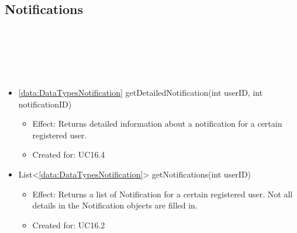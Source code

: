   \subsection{Notifications}\label{int:OnlineServiceOnlineServiceNotificationHandlerNotifications}
    \begin{description}
      \item[Provided by:] \iconcomponent{}~
      \item[Required by:] \iconcomponent{}~
      \item[Operations:] ~
    \begin{itemize}[noitemsep,nolistsep,leftmargin=-.25cm]
      \item \textsf{\ref{data:DataTypesNotification} getDetailedNotification(int userID, int notificationID)}
        \begin{itemize}[noitemsep,nolistsep]
           \item Effect: Returns detailed information about a notification for a certain registered user.
\item Created for: UC16.4
        \end{itemize}
      \item \textsf{List\textless{}\ref{data:DataTypesNotification}\textgreater{} getNotifications(int userID)}
        \begin{itemize}[noitemsep,nolistsep]
           \item Effect: Returns a list of Notification for a certain registered user. Not all details in the Notification objects are filled in.
\item Created for: UC16.2
        \end{itemize}
    \end{itemize}
    \end{description}

